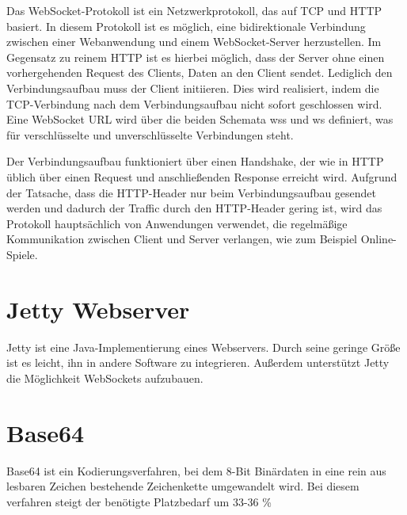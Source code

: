 Das WebSocket-Protokoll ist ein Netzwerkprotokoll, das auf TCP und HTTP basiert. In diesem Protokoll ist es möglich, eine bidirektionale Verbindung zwischen einer Webanwendung und einem WebSocket-Server herzustellen. Im Gegensatz zu reinem HTTP ist es hierbei möglich, dass der Server ohne einen vorhergehenden Request des Clients, Daten an den Client sendet. Lediglich den Verbindungsaufbau muss der Client initiieren. Dies wird realisiert, indem die TCP-Verbindung nach dem Verbindungsaufbau nicht sofort geschlossen wird. 
Eine WebSocket URL wird über die beiden Schemata wss und ws definiert, was für verschlüsselte und unverschlüsselte Verbindungen steht.

Der Verbindungsaufbau funktioniert über einen Handshake, der wie in HTTP üblich über einen Request und anschließenden Response erreicht wird. Aufgrund der Tatsache, dass die HTTP-Header nur beim Verbindungsaufbau gesendet werden und dadurch der Traffic durch den HTTP-Header gering ist, wird das Protokoll hauptsächlich von Anwendungen verwendet, die regelmäßige Kommunikation zwischen Client und Server verlangen, wie zum Beispiel Online-Spiele.



\section{Jetty Webserver}

Jetty ist eine Java-Implementierung eines Webservers. Durch seine geringe Größe ist es leicht, ihn in andere Software zu integrieren. Außerdem unterstützt Jetty die Möglichkeit WebSockets aufzubauen.


\section{Base64}
Base64 ist ein Kodierungsverfahren, bei dem 8-Bit Binärdaten in eine rein aus lesbaren Zeichen bestehende Zeichenkette umgewandelt wird. Bei diesem verfahren steigt der benötigte Platzbedarf um 33-36 \%